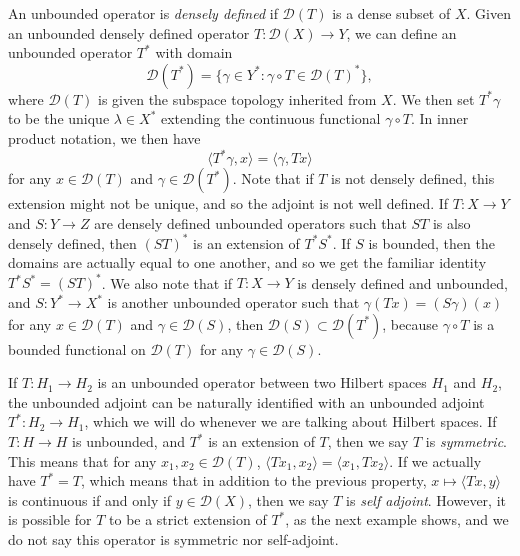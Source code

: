 An unbounded operator is \emph{densely defined} if $\mathcal{D}(T)$ is a dense subset of $X$. Given an unbounded densely defined operator $T: \mathcal{D}(X) \to Y$, we can define an unbounded operator $T^*$ with domain
%
\[ \mathcal{D}(T^*) = \{ \gamma \in Y^*: \gamma \circ T \in \mathcal{D}(T)^* \}, \]
%
where $\mathcal{D}(T)$ is given the subspace topology inherited from $X$. We then set $T^* \gamma$ to be the unique $\lambda \in X^*$ extending the continuous functional $\gamma \circ T$. In inner product notation, we then have
%
\[ \langle T^* \gamma, x \rangle = \langle \gamma, Tx \rangle \]
%
for any $x \in \mathcal{D}(T)$ and $\gamma \in \mathcal{D}(T^*)$. Note that if $T$ is not densely defined, this extension might not be unique, and so the adjoint is not well defined. If $T: X \to Y$ and $S: Y \to Z$ are densely defined unbounded operators such that $ST$ is also densely defined, then $(ST)^*$ is an extension of $T^* S^*$. If $S$ is bounded, then the domains are actually equal to one another, and so we get the familiar identity $T^* S^* = (ST)^*$. We also note that if $T: X \to Y$ is densely defined and unbounded, and $S: Y^* \to X^*$ is another unbounded operator such that $\gamma(Tx) = (S\gamma)(x)$ for any $x \in \mathcal{D}(T)$ and $\gamma \in \mathcal{D}(S)$, then $\mathcal{D}(S) \subset \mathcal{D}(T^*)$, because $\gamma \circ T$ is a bounded functional on $\mathcal{D}(T)$ for any $\gamma \in \mathcal{D}(S)$.

%
%

If $T: H_1 \to H_2$ is an unbounded operator between two Hilbert spaces $H_1$ and $H_2$, the unbounded adjoint can be naturally identified with an unbounded adjoint $T^*: H_2 \to H_1$, which we will do whenever we are talking about Hilbert spaces. If $T: H \to H$ is unbounded, and $T^*$ is an extension of $T$, then we say $T$ is \emph{symmetric}. This means that for any $x_1,x_2 \in \mathcal{D}(T)$, $\langle Tx_1, x_2 \rangle = \langle x_1, Tx_2 \rangle$. If we actually have $T^* = T$, which means that in addition to the previous property, $x \mapsto \langle Tx, y \rangle$ is continuous if and only if $y \in \mathcal{D}(X)$, then we say $T$ is \emph{self adjoint}. However, it is possible for $T$ to be a strict extension of $T^*$, as the next example shows, and we do not say this operator is symmetric nor self-adjoint. 

